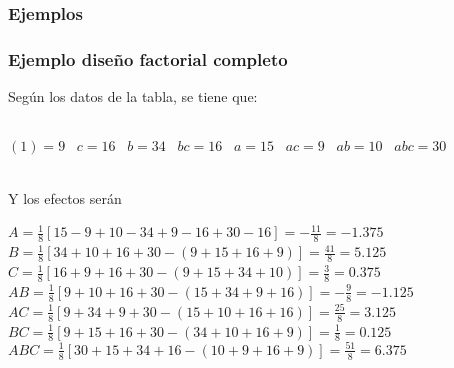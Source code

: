 \documentclass[12pt]{beamer}
\begin{document}
\begin{frame}
\frametitle{Ejemplos}
\begin{table}[htbp]
  \centering
  \caption{Datos ejemplo diseño $2^3$}
  \label{tab:addlabel}%
\end{table}%
\end{frame}

\begin{frame}
\justifying
\frametitle{Ejemplo diseño factorial completo}
Según los datos de la tabla, se tiene que:
\begin{center}
~\\$(1)=9 \;\;\; c=16 \;\;\; b=34 \;\;\; bc=16 \;\;\; a=15 \;\;\; ac=9 \;\;\; ab=10 \;\;\; abc=30$
\end{center}

~\\Y los efectos serán
\begin{center}
$A=\frac{1}{8}[15-9+10-34+9-16+30-16]=-\frac{11}{8}=-1.375$
~\\$B=\frac{1}{8}[34+10+16+30-(9+15+16+9)]=\frac{41}{8}=5.125$
~\\$C=\frac{1}{8}[16+9+16+30-(9+15+34+10)]=\frac{3}{8}=0.375$
~\\$AB=\frac{1}{8}[9+10+16+30-(15+34+9+16)]=-\frac{9}{8}=-1.125$
~\\$AC=\frac{1}{8}[9+34+9+30-(15+10+16+16)]=\frac{25}{8}=3.125$
~\\$BC=\frac{1}{8}[9+15+16+30-(34+10+16+9)]=\frac{1}{8}=0.125$
~\\$ABC=\frac{1}{8}[30+15+34+16-(10+9+16+9)]=\frac{51}{8}=6.375$
\end{center}

\end{frame}
\end{document}
